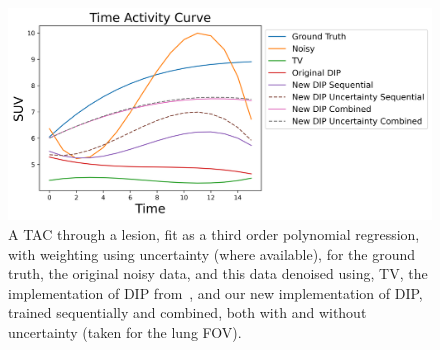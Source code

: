         \begin{figure}
            \centering
            
            \includegraphics[width=1.0\linewidth]{figures/deep_image_prior_results_tac.png}
            
            \captionsetup{singlelinecheck=false}
            \caption{
                A \gls{TAC} through a lesion, fit as a third order polynomial regression, with weighting using uncertainty (where available), for the ground truth, the original noisy data, and this data denoised using, \gls{TV}, the implementation of \gls{DIP} from~\parencite{Gong2019PETPrior}, and our new implementation of \gls{DIP}, trained sequentially and combined, both with and without uncertainty (taken for the lung \gls{FOV}).
            }
            \label{fig:pseudo_bayesian_dip_denoising_as_a_preprocessing_step_for_kinetic_modelling_in_dynamic_pet_appendix_results_tac}
        \end{figure}
        
